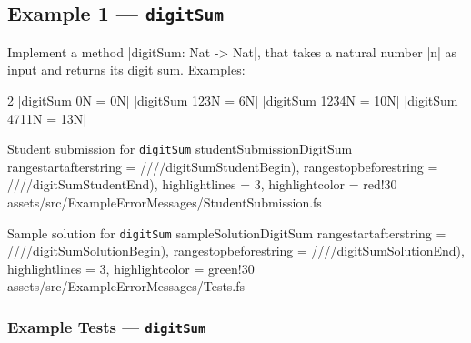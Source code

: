 \subsection{Example 1 --- \texttt{digitSum}} %


Implement a method \fsharp|digitSum: Nat -> Nat|,
that takes a natural number \fsharp|n| as input and returns its digit sum. Examples:
\begin{center}\begin{multicols}{2}
	\noindent
	\fsharp|digitSum 0N = 0N|
	\fsharp|digitSum 123N = 6N|
	\fsharp|digitSum 1234N = 10N|
	\fsharp|digitSum 4711N = 13N|
\end{multicols}\end{center}




\fsharpinput%
{Student submission for \texttt{digitSum}}%
{studentSubmissionDigitSum}%
{
	rangestartafterstring = ////digitSumStudentBegin),
	rangestopbeforestring = ////digitSumStudentEnd),
	highlightlines = {3},
	highlightcolor = red!30
}%
{assets/src/ExampleErrorMessages/StudentSubmission.fs}




\fsharpinput%
{Sample solution for \texttt{digitSum}}%
{sampleSolutionDigitSum}%
{
	rangestartafterstring = ////digitSumSolutionBegin),
	rangestopbeforestring = ////digitSumSolutionEnd),
	highlightlines = {3},
	highlightcolor = green!30
}%
{assets/src/ExampleErrorMessages/Tests.fs}


\newpage %
\subsubsection{Example Tests --- \texttt{digitSum}} %


